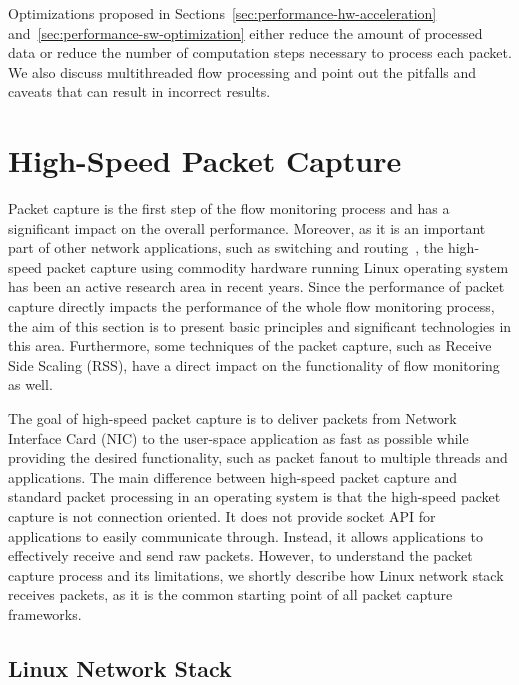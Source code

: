 Optimizations proposed in Sections~\ref{sec:performance-hw-acceleration} and~\ref{sec:performance-sw-optimization} either reduce the amount of processed data or reduce the number of computation steps necessary to process each packet. We also discuss multithreaded flow processing and point out the pitfalls and caveats that can result in incorrect results.


\section{High-Speed Packet Capture}\label{sec:performance-capture}

Packet capture is the first step of the flow monitoring process and has a significant impact on the overall performance. Moreover, as it is an important part of other network applications, such as switching and routing~\cite{Kawashima-2016-Host}, the high-speed packet capture using commodity hardware running Linux operating system has been an active research area in recent years. Since the performance of packet capture directly impacts the performance of the whole flow monitoring process, the aim of this section is to present basic principles and significant technologies in this area. Furthermore, some techniques of the packet capture, such as Receive Side Scaling (RSS), have a direct impact on the functionality of flow monitoring as well.

The goal of high-speed packet capture is to deliver packets from Network Interface Card (NIC) to the user-space application as fast as possible while providing the desired functionality, such as packet fanout to multiple threads and applications. The main difference between high-speed packet capture and standard packet processing in an operating system is that the high-speed packet capture is not connection oriented. It does not provide socket API for applications to easily communicate through. Instead, it allows applications to effectively receive and send raw packets. However, to understand the packet capture process and its limitations, we shortly describe how Linux network stack receives packets, as it is the common starting point of all packet capture frameworks.

\subsection{Linux Network Stack}

